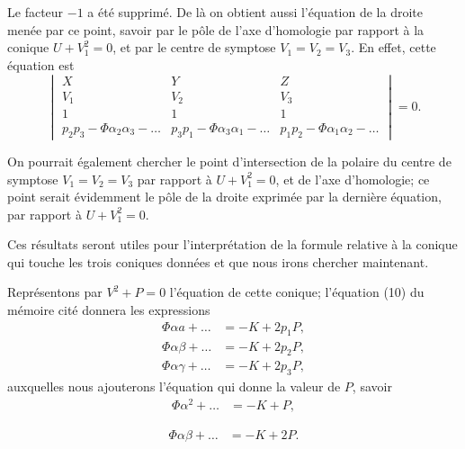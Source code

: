 \documentclass[11pt,a4paper]{book}
\begin{document}
Le facteur $-1$ a \'{e}t\'{e} supprim\'{e}. De l\`{a} on obtient aussi l'\'{e}quation de la droite men\'{e}e par ce point, savoir par le p\^{o}le de l'axe d'homologie par rapport \`{a} la conique $U + V_1^2 = 0$, et par le centre de symptose $V_1 = V_2 = V_3$. En effet, cette \'{e}quation est
\begin{equation}\tag{10}
\begin{vmatrix}
X & Y & Z \\
V_1 & V_2 & V_3 \\
1 & 1 & 1 \\
p_2 p_3 - \Phi \alpha_2 \alpha_3 - \ldots & p_3 p_1 - \Phi \alpha_3 \alpha_1 - \ldots & p_1 p_2 - \Phi \alpha_1 \alpha_2 - \ldots
\end{vmatrix} = 0.
\end{equation}

On pourrait \'{e}galement chercher le point d'intersection de la polaire du centre de symptose $V_1 = V_2 = V_3$ par rapport \`{a} $U + V_1^2 = 0$, et de l'axe d'homologie; ce point serait \'{e}videmment le p\^{o}le de la droite exprim\'{e}e par la derni\`{e}re \'{e}quation, par rapport \`{a} $U + V_1^2 = 0$.

Ces r\'{e}sultats seront utiles pour l'interpr\'{e}tation de la formule relative \`{a} la conique qui touche les trois coniques donn\'{e}es et que nous irons chercher maintenant.

Repr\'{e}sentons par $V^2 + P = 0$ l'\'{e}quation de cette conique; l'\'{e}quation (10) du m\'{e}moire cit\'{e} donnera les expressions
\begin{align*}
\Phi \alpha a + \ldots &= -K + 2p_1 P, \\
\Phi \alpha \beta + \ldots &= -K + 2p_2 P, \\
\Phi \alpha \gamma + \ldots &= -K + 2p_3 P,
\end{align*}
auxquelles nous ajouterons l'\'{e}quation qui donne la valeur de $P$, savoir
\begin{align}
\tag{11} \Phi \alpha^2 + \ldots &= -K + P,
\end{align}

\begin{align}
\tag{12} \Phi \alpha \beta + \ldots &= -K + 2P.
\end{align}
\end{document}
